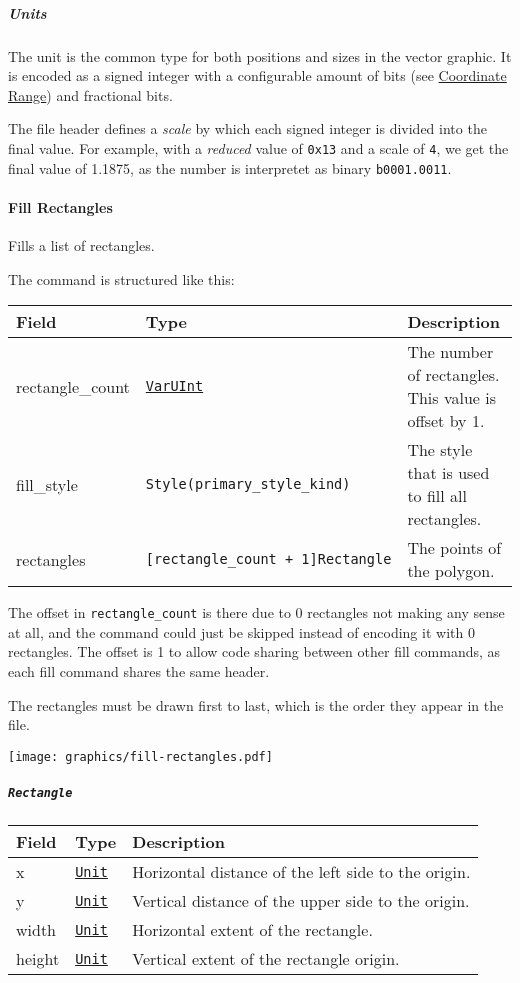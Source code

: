 \documentclass[]{article}
\begin{document}
\hypertarget{units}{%
\subparagraph{Units}\label{units}}

The unit is the common type for both positions and sizes in the vector
graphic. It is encoded as a signed integer with a configurable amount of
bits (see \protect\hyperlink{coordinate-range}{Coordinate Range}) and
fractional bits.

The file header defines a \emph{scale} by which each signed integer is
divided into the final value. For example, with a \emph{reduced} value
of \texttt{0x13} and a scale of \texttt{4}, we get the final value of
1.1875, as the number is interpretet as binary \texttt{b0001.0011}.

\hypertarget{fill-rectangles}{%
\paragraph{Fill Rectangles}\label{fill-rectangles}}

Fills a list of rectangles.

The command is structured like this:

\begin{longtable}[]{@{}p{1in}p{2in}p{3in}@{}}
\toprule
Field & Type & Description \\
\midrule
\endhead
rectangle\_count & \protect\hyperlink{varuint}{\texttt{VarUInt}} & The
number of rectangles. This value is offset by 1. \\
fill\_style & \texttt{Style(primary\_style\_kind)} & The style that is
used to fill all rectangles. \\
rectangles & \texttt{{[}rectangle\_count\ +\ 1{]}Rectangle} & The points
of the polygon. \\
\bottomrule
\end{longtable}

The offset in \texttt{rectangle\_count} is there due to 0 rectangles not
making any sense at all, and the command could just be skipped instead of
encoding it with 0 rectangles. The offset is 1 to allow code sharing
between other fill commands, as each fill command shares the same
header.

The rectangles must be drawn first to last, which is the order they appear
in the file.

\texttt{[image: graphics/fill-rectangles.pdf]}

\hypertarget{rectangle}{%
\subparagraph{\texorpdfstring{\texttt{Rectangle}}{Rectangle}}\label{rectangle}}

\begin{longtable}[]{@{}p{1in}p{2in}p{3in}@{}}
\toprule
Field & Type & Description \\
\midrule
\endhead
x & \protect\hyperlink{units}{\texttt{Unit}} & Horizontal distance of
the left side to the origin. \\
y & \protect\hyperlink{units}{\texttt{Unit}} & Vertical distance of the
upper side to the origin. \\
width & \protect\hyperlink{units}{\texttt{Unit}} & Horizontal extent of
the rectangle. \\
height & \protect\hyperlink{units}{\texttt{Unit}} & Vertical extent of
the rectangle origin. \\
\bottomrule
\end{longtable}
\end{document}
